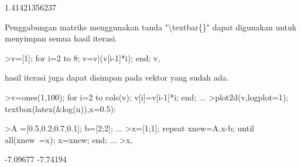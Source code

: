 \documentclass[12pt,arial,letterpaper]{book}
\begin{document}
\begin{eulernootebook}
\begin{eulercomment}
\begin{eulercomment}
\begin{eulernootebook}
\begin{eulercomment}
\begin{eulercomment}
\begin{eulercomment}
\begin{eulercomment}
\begin{eulercomment}
\begin{eulercomment}
\begin{eulernotebook}
\begin{eulercomment}
\begin{eulercomment}
\begin{eulercomment}
\begin{eulercomment}
\begin{eulercomment}
\begin{eulercomment}
\begin{eulercomment}
\begin{eulercomment}
\begin{eulercomment}
\begin{eulercomment}
\begin{eulercomment}
\begin{eulercomment}
\begin{eulercomment}
\begin{eulercomment}
\begin{eulercomment}
\begin{eulercomment}
\begin{eulercomment}
\begin{eulercomment}
\begin{eulercomment}
\begin{eulercomment}
\begin{eulercomment}
\begin{eulercomment}
\begin{eulercomment}
\begin{eulercomment}
\begin{eulercomment}
\begin{eulercomment}
\begin{eulercomment}
\begin{eulercomment}
\begin{eulercomment}
\begin{eulercomment}
\begin{eulercomment}
\begin{eulercomment}
\begin{euleroutput}
  1.41421356237
\end{euleroutput}
\begin{eulercomment}
Penggabungan matriks menggunakan tanda "\textbackslash{}textbar\{\}" dapat digunakan
untuk menyimpan semua hasil iterasi.
\end{eulercomment}
\begin{eulerprompt}
>v=[1]; for i=2 to 8; v=v|(v[i-1]*i); end; v,
\end{eulerprompt}
\begin{euleroutput}
  [1,  2,  6,  24,  120,  720,  5040,  40320]
\end{euleroutput}
\begin{eulercomment}
hasil iterasi juga dapat disimpan pada vektor yang sudah ada.
\end{eulercomment}
\begin{eulerprompt}
>v=ones(1,100); for i=2 to cols(v); v[i]=v[i-1]*i; end; ...
>plot2d(v,logplot=1); textbox(latex(&log(n)),x=0.5):
\end{eulerprompt}
\begin{eulerprompt}
>A =[0.5,0.2;0.7,0.1]; b=[2;2]; ...
>x=[1;1]; repeat xnew=A.x-b; until all(xnew~=x); x=xnew; end; ...
>x,
\end{eulerprompt}
\begin{euleroutput}
       -7.09677 
       -7.74194 
\end{euleroutput}
\begin{eulercomment}

\end{eulercomment}
\end{eulercomment}
\end{eulercomment}
\end{eulercomment}
\end{eulercomment}
\end{eulercomment}
\end{eulercomment}
\end{eulercomment}
\end{eulercomment}
\end{eulercomment}
\end{eulercomment}
\end{eulercomment}
\end{eulercomment}
\end{eulercomment}
\end{eulercomment}
\end{eulercomment}
\end{eulercomment}
\end{eulercomment}
\end{eulercomment}
\end{eulercomment}
\end{eulercomment}
\end{eulercomment}
\end{eulercomment}
\end{eulercomment}
\end{eulercomment}
\end{eulercomment}
\end{eulercomment}
\end{eulercomment}
\end{eulercomment}
\end{eulercomment}
\end{eulercomment}
\end{eulercomment}
\end{eulercomment}
\end{eulernotebook}
\end{eulercomment}
\end{eulercomment}
\end{eulercomment}
\end{eulercomment}
\end{eulercomment}
\end{eulercomment}
\end{eulernootebook}
\end{eulercomment}
\end{eulercomment}
\end{eulernootebook}
\end{document}
